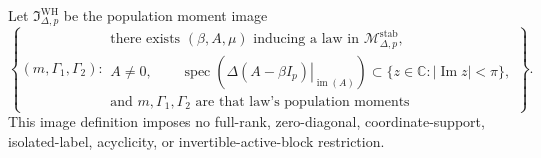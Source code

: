 Let \(\mathfrak I_{\Delta,p}^{\mathrm{WH}}\) be the population moment image
\[
 \left\{(m,\Gamma_1,\Gamma_2):\begin{array}{l}
 \text{there exists }(\beta,A,\mu)\text{ inducing a law in }\mathcal M_{\Delta,p}^{\mathrm{stab}},\\
 A\neq0,\qquad
 \operatorname{spec}\!\left(\left.\Delta(A-\beta I_p)\right|_{\operatorname{im}(A)}\right)
 \subset\{z\in\mathbb C:|\operatorname{Im}z|<\pi\},\\
 \text{and }m,\Gamma_1,\Gamma_2\text{ are that law's population moments}
 \end{array}\right\}.
\]
This image definition imposes no full-rank, zero-diagonal, coordinate-support, isolated-label, acyclicity, or invertible-active-block restriction.